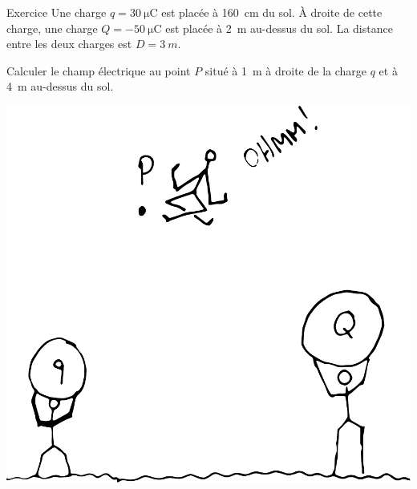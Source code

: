 \documentclass{beamer}
\begin{document}
\begin{frame}{Exercice}
  Une charge $q = \SI{30}{\micro\coulomb}$ est placée à \SI{160}{cm} du sol. À
  droite de cette charge, une charge $Q = \SI{-50}{\micro\coulomb}$ est placée
  à \SI{2}{m} au-dessus du sol. La distance entre les deux charges est $D =
  \SI{3}{m}$.

  Calculer le champ électrique au point $P$ situé à \SI{1}{m} à droite de la
  charge $q$ et à \SI{4}{m} au-dessus du sol.

  \begin{center}
    \includegraphics[scale=0.3]{figures/champ-deux-charges-1.pdf}
  \end{center}
\end{frame}
\end{document}
